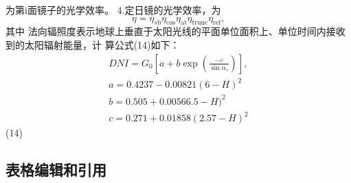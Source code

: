 \documentclass[a4paper,12pt]{article}
\begin{document}
	为第i面镜子的光学效率。
	4.定日镜的光学效率，为
	$$
	\eta=\eta_{s\mathrm{b}}\eta_{\mathrm{cos}}\eta_{\mathrm{at}}\eta_{\mathrm{trunc}}\eta_{\mathrm{ref}},
	$$
	其中
	法向辐照度表示地球上垂直于太阳光线的平面单位面积上、单位时间内接收到的太阳辐射能量，计
	算公式(14)如下：
	$$
	\begin{array}{c}{{D N I=G_{0}\left[a+b\exp\left(\frac{-c}{\sin\alpha_{s}}\right)\right],}}\\ {{a=0.4237-0.00821(6-H)^{2}}}\\ {{b=0.505+0.00566.5-H)^{2}}}\\ {{c=0.271+0.01858(2.57-H)^{2}}}\end{array}
	$$
	(14)
	
	
	\subsection{表格编辑和引用}
	
\end{document}
